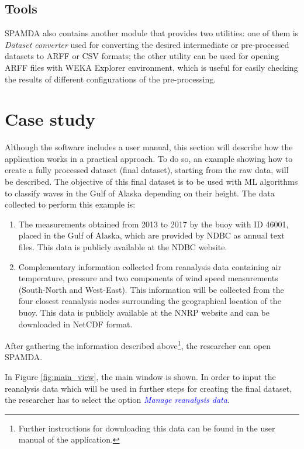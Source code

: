 \documentclass[energies,article,submit,moreauthors,pdftex]{Definitions/mdpi}
\begin{document}
			\subsection{Tools}
			
				SPAMDA also contains another module that provides two utilities: one of them is \textit{Dataset converter} used for converting the desired intermediate or pre-processed datasets to ARFF or CSV formats; the other utility can be used for opening ARFF files with WEKA Explorer environment, which is useful for easily checking the results of different configurations of the pre-processing.
				
	\section{Case study}\label{sec:CaseStudy}
			
		Although the software includes a user manual, this section will describe how the application works in a practical approach. To do so, an example showing how to create a fully processed dataset (final dataset), starting from the raw data, will be described. The objective of this final dataset is to be used with ML algorithms to classify waves in the Gulf of Alaska depending on their height. The data collected to perform this example is:
		\begin{enumerate}[leftmargin=*,labelsep=4.9mm]
		\item The measurements obtained from 2013 to 2017 by the buoy with ID 46001, placed in the Gulf of Alaska, which are provided by NDBC as annual text files. This data is publicly available at the NDBC website. 
		\item Complementary information collected from reanalysis data containing air temperature, pressure and two components of wind speed measurements (South-North and West-East). This information will be collected from the four closest reanalysis nodes surrounding the geographical location of the buoy. This data is publicly available at the NNRP website and can be downloaded in NetCDF format.
		\end{enumerate}
		
		After gathering the information described above\footnote{Further instructions for downloading this data can be found in the user manual of the application.}, the researcher can open SPAMDA.
		
		In Figure \ref{fig:main_view}, the main window is shown. In order to input the reanalysis data which will be used in further steps for creating the final dataset, the researcher has to select the option \textcolor{blue}{\textit{Manage reanalysis data}}.
		
\end{document}
